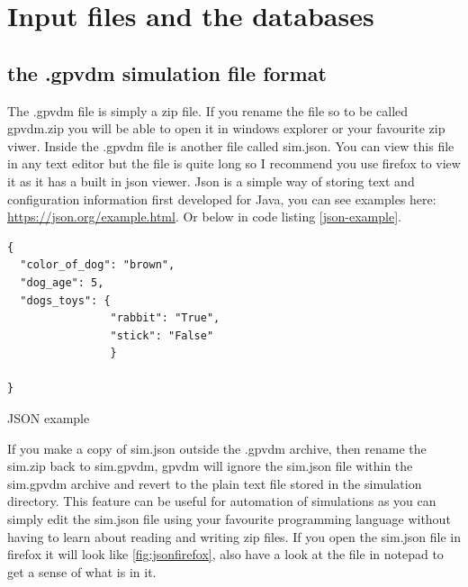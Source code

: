 \chapter{Input files and the databases}

\section{the .gpvdm simulation file format}
\label{sec:gpvdmfileformat} 
The .gpvdm file is simply a zip file. If you rename the file so to be called gpvdm.zip you will be able to open it in windows explorer or your favourite zip viwer.  Inside the .gpvdm file is another file called sim.json. You can view this file in any text editor but the file is quite long so I recommend you use firefox to view it as it has a built in json viewer.  Json is a simple way of storing text and configuration information first developed for Java, you can see examples here: \url{https://json.org/example.html}. Or below in code listing \ref{json-example}.

\begin{listing}
\begin{verbatim}
{
  "color_of_dog": "brown",
  "dog_age": 5,
  "dogs_toys": {
				"rabbit": "True",
				"stick": "False"
				}

}
\end{verbatim}
\caption{JSON example} 
\label{json-example}
\end{listing}


If you make a copy of sim.json outside the .gpvdm archive, then rename the sim.zip back to sim.gpvdm, gpvdm will ignore the sim.json file within the sim.gpvdm archive and revert to the plain text file stored in the simulation directory.  This feature can be useful for automation of simulations as you can simply edit the sim.json file using your favourite programming language without having to learn about reading and writing zip files. If you open the sim.json file in firefox it will look like \ref{fig:jsonfirefox}, also have a look at the file in notepad to get a sense of what is in it.


